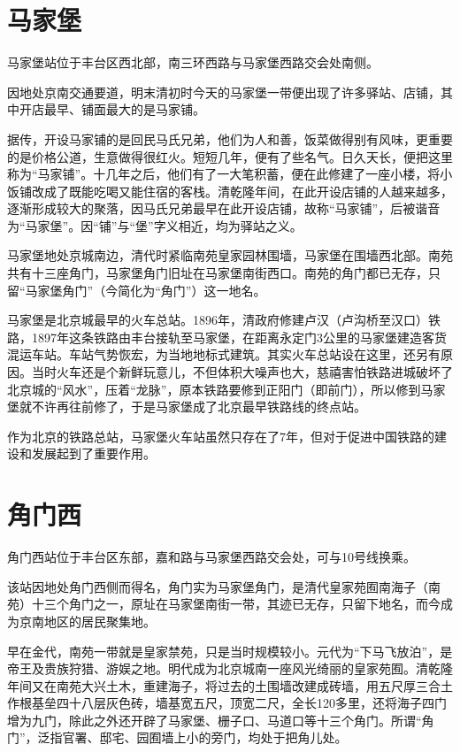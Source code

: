 \section{马家堡}
马家堡站位于丰台区西北部，南三环西路与马家堡西路交会处南侧。

因地处京南交通要道，明末清初时今天的马家堡一带便出现了许多驿站、店铺，其中开店最早、铺面最大的是马家铺。

据传，开设马家铺的是回民马氏兄弟，他们为人和善，饭菜做得别有风味，更重要的是价格公道，生意做得很红火。短短几年，便有了些名气。日久天长，便把这里称为“马家铺”。十几年之后，他们有了一大笔积蓄，便在此修建了一座小楼，将小饭铺改成了既能吃喝又能住宿的客栈。清乾隆年间，在此开设店铺的人越来越多，逐渐形成较大的聚落，因马氏兄弟最早在此开设店铺，故称“马家铺”，后被谐音为“马家堡”。因“铺”与“堡”字义相近，均为驿站之义。

马家堡地处京城南边，清代时紧临南苑皇家园林围墙，马家堡在围墙西北部。南苑共有十三座角门，马家堡角门旧址在马家堡南街西口。南苑的角门都已无存，只留“马家堡角门”（今简化为“角门”）这一地名。

马家堡是北京城最早的火车总站。1896年，清政府修建卢汉（卢沟桥至汉口）铁路，1897年这条铁路由丰台接轨至马家堡，在距离永定门3公里的马家堡建造客货混运车站。车站气势恢宏，为当地地标式建筑。其实火车总站设在这里，还另有原因。当时火车还是个新鲜玩意儿，不但体积大噪声也大，慈禧害怕铁路进城破坏了北京城的“风水”，压着“龙脉”，原本铁路要修到正阳门（即前门），所以修到马家堡就不许再往前修了，于是马家堡成了北京最早铁路线的终点站。

作为北京的铁路总站，马家堡火车站虽然只存在了7年，但对于促进中国铁路的建设和发展起到了重要作用。

\section{角门西}
角门西站位于丰台区东部，嘉和路与马家堡西路交会处，可与10号线换乘。

该站因地处角门西侧而得名，角门实为马家堡角门，是清代皇家苑囿南海子（南苑）十三个角门之一，原址在马家堡南街一带，其迹已无存，只留下地名，而今成为京南地区的居民聚集地。

早在金代，南苑一带就是皇家禁苑，只是当时规模较小。元代为“下马飞放泊”，是帝王及贵族狩猎、游娱之地。明代成为北京城南一座风光绮丽的皇家苑囿。清乾隆年间又在南苑大兴土木，重建海子，将过去的土围墙改建成砖墙，用五尺厚三合土作根基垒四十八层灰色砖，墙基宽五尺，顶宽二尺，全长120多里，还将海子四门增为九门，除此之外还开辟了马家堡、栅子口、马道口等十三个角门。所谓“角门”，泛指官署、邸宅、园囿墙上小的旁门，均处于把角儿处。

